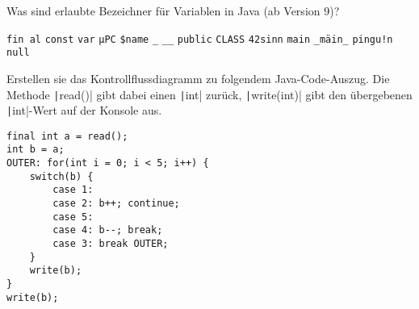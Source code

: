 \documentclass[11pt]{exam} %
\newcommand{\code}[1]{\texttt|#1|}
\begin{document}
\begin{questions}
\question Was sind erlaubte Bezeichner für Variablen in Java (ab Version 9)?
\begin{checkboxes}
\choice \texttt{fin al}
\CorrectChoice \texttt{const}
\CorrectChoice \texttt{var}
\CorrectChoice \texttt{µPC}
\CorrectChoice \texttt{\$name}
\choice \texttt{\_}
\CorrectChoice \texttt{\_\_}
\choice \texttt{public}
\CorrectChoice \texttt{CLASS}
\choice \texttt{42sinn}
\CorrectChoice \texttt{main}
\CorrectChoice \texttt{\_mäin\_}
\choice \texttt{pingu!n}
\choice \texttt{null}
\end{checkboxes}
\question Erstellen sie das Kontrollflussdiagramm zu folgendem Java-Code-Auszug. Die Methode \code{read()} gibt dabei einen \code{int} zurück, \code{write(int)} gibt den übergebenen \code{int}-Wert auf der Konsole aus.
\begin{verbatim}
final int a = read();
int b = a;
OUTER: for(int i = 0; i < 5; i++) {
	switch(b) {
		case 1:
		case 2: b++; continue;
		case 5:
		case 4: b--; break;
		case 3: break OUTER;
	}
	write(b);
}
write(b);
\end{verbatim}

\end{questions}
\end{document}

